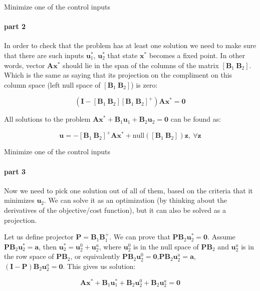\documentclass{beamer}
\begin{document}
\begin{frame}{Minimize one of the control inputs}
\framesubtitle{part 2}
\begin{flushleft}

In order to check that the problem has at least one solution we need to make sure that there are such inputs $\mathbf{u}^*_1$, $\mathbf{u}^*_2$ that state $\mathbf{x}^*$ becomes a fixed point. In other words, vector $\mathbf{A}\mathbf{x}^*$ should lie in the span of the columns of the matrix $[\mathbf{B}_1 \ \mathbf{B}_2]$. Which is the same as saying that its projection on the compliment on this column space (left null space of $[\mathbf{B}_1 \ \mathbf{B}_2]$) is zero:

\begin{equation}
    (\mathbf{I} - [\mathbf{B}_1 \ \mathbf{B}_2] [\mathbf{B}_1 \ \mathbf{B}_2]^+) \mathbf{A}\mathbf{x}^* = \mathbf{0}
\end{equation}

All solutions to the problem $\mathbf{A} \mathbf{x}^* + \mathbf{B}_1 \mathbf{u}_1 + \mathbf{B}_2 \mathbf{u}_2 = \mathbf{0}$ can be found as:

\begin{equation}
    \mathbf{u} = - [\mathbf{B}_1 \ \mathbf{B}_2]^+ \mathbf{A}\mathbf{x}^* + \text{null}([\mathbf{B}_1 \ \mathbf{B}_2])\mathbf{z}, \ \forall \mathbf{z}
\end{equation}

\end{flushleft}
\end{frame}



\begin{frame}{Minimize one of the control inputs}
\framesubtitle{part 3}
\begin{flushleft}

Now we need to pick one solution out of all of them, based on the criteria that it minimizes $\mathbf{u}_2$. We can solve it as an optimization (by thinking about the derivatives of the objective/cost function), but it can also be solved as a projection.

\bigskip

Let us define projector $\mathbf{P} = \mathbf{B}_1 \mathbf{B}^+_1$. We can prove that $\mathbf{P} \mathbf{B}_2 \mathbf{u}^*_2 = \mathbf{0}$. Assume $\mathbf{P} \mathbf{B}_2 \mathbf{u}^*_2 = \mathbf{a}$, then $\mathbf{u}^*_2 =  \mathbf{u}^0_2 + \mathbf{u}^a_2$, where $\mathbf{u}^0_2$ is in the null space of $\mathbf{P} \mathbf{B}_2$ and $\mathbf{u}^a_2$ is in the row space of $\mathbf{P} \mathbf{B}_2$, or equivalently $\mathbf{P} \mathbf{B}_2 \mathbf{u}^0_2 = \mathbf{0}$,$\mathbf{P} \mathbf{B}_2 \mathbf{u}^a_2 = \mathbf{a}$, $(\mathbf{I} - \mathbf{P}) \mathbf{B}_2 \mathbf{u}^a_2 = \mathbf{0}$. This gives us solution:

\begin{equation}
    \mathbf{A} \mathbf{x}^* + \mathbf{B}_1 \mathbf{u}^*_1 + \mathbf{B}_2 \mathbf{u}^0_2 + \mathbf{B}_2 \mathbf{u}^a_2 = \mathbf{0}
\end{equation}

\end{flushleft}
\end{frame}
\end{document}
